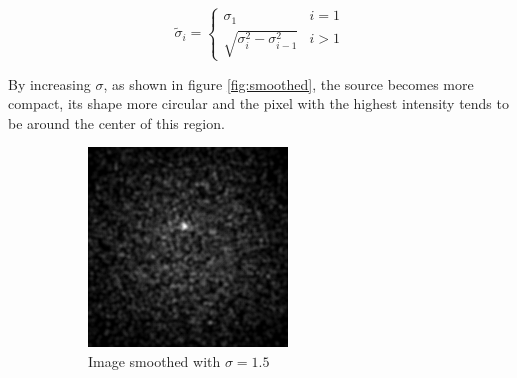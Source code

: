 \documentclass[a4paper,12pt,oneside]{book}
\begin{document}
\begin{onehalfspace}
    \begin{equation}
	\tilde{\sigma}_{i} =
	    \begin{cases}
	        \sigma_{1} &\text{$i = 1$} \\ 
    	    \sqrt{\sigma_{i}^2 - \sigma_{i-1}^2} &\text{$i > 1$}
	    \end{cases}
	\end{equation}
	
	By increasing $\sigma$, as shown in figure \ref{fig:smoothed}, the source becomes more compact, its shape more circular and the pixel with the highest intensity tends to be around the center of this region.
	
	\begin{figure}
	\centering
	\captionsetup[subfigure]{justification=centering}
	\begin{subfigure}{.3\textwidth}
		\centering
		\includegraphics[width=\linewidth]{smooth3}
		\caption{Image smoothed with $\sigma=1.5$}
		\label{fig:smooth3}
	\end{subfigure}
	\begin{subfigure}{.3\textwidth}
		\centering

\end{subfigure}
\end{figure}
\end{onehalfspace}
\end{document}
